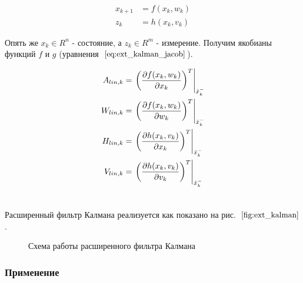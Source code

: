 \documentclass[12pt,a4paper]{article}
\begin{document}
\begin{align*}
	x_{k+1} &= f(x_k,w_k) \\
	z_k &= h(x_k,v_k)
\end{align*}

Опять же $x_k \in R^n$ - состояние, а $z_k \in R^m$ - измерение. Получим якобианы функций $f$ и $g$ (уравнения~$\eqref{eq:ext_kalman_jacob}$).

\begin{subequations}
	\label{eq:ext_kalman_jacob}
	\begin{align}
		\label{eq:ext_kalman_A} A_{lin,k} &= \left.\left( \frac{\partial f(x_k,w_k)}{\partial x_k} \right)^T\right|_{\hat x_k^-} \\
		\label{eq:ext_kalman_W} W_{lin,k} &= \left.\left( \frac{\partial f(x_k,w_k)}{\partial w_k} \right)^T\right|_{\hat x_k^-} \\
		\label{eq:ext_kalman_H} H_{lin,k} &= \left.\left( \frac{\partial h(x_k,v_k)}{\partial x_k} \right)^T\right|_{\hat x_k^-} \\
		\label{eq:ext_kalman_V} V_{lin,k} &= \left.\left( \frac{\partial h(x_k,v_k)}{\partial v_k} \right)^T\right|_{\hat x_k^-} \\
	\notag
	\end{align}
\end{subequations}


Расширенный фильтр Калмана реализуется как показано на рис.~$\ref{fig:ext_kalman}$.

\begin{figure}
	\caption{Схема работы расширенного фильтра Калмана}
	\label{fig:ext_kalman}
\end{figure}


\subsubsection{Применение}
\end{document}
